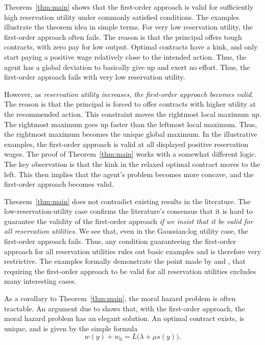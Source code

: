 Theorem~\ref{thm:main} shows that the first-order approach is valid for sufficiently high reservation utility under commonly satisfied conditions. The examples illustrate the theorem idea in simple terms. For very low reservation utility, the first-order approach often fails. The reason is that the principal offers tough contracts, with zero pay for low output. Optimal contracts have a kink, and only start paying a positive wage relatively close to the intended action. Thus, the agent has a global deviation to basically give up and exert no effort. Thus, the first-order approach fails with very low reservation utility.

However, as \emph{reservation utility increases, the first-order approach becomes valid}. The reason is that the principal is forced to offer contracts with higher utility at the recommended action. This constraint moves the rightmost local maximum up. The rightmost maximum goes up faster than the leftmost local maximum. Thus, the rightmost maximum becomes the unique global maximum. In the illustrative examples, the first-order approach is valid at all displayed positive reservation wages. The proof of Theorem~\ref{thm:main} works with a somewhat different logic. The key observation is that the kink in the relaxed optimal contract moves to the left. This then implies that the agent's problem becomes more concave, and the first-order approach becomes valid.

Theorem~\ref{thm:main} does not contradict existing results in the literature. The low-reservation-utility case confirms the literature's consensus that it is hard to guarantee the validity of the first-order approach \emph{if we insist that it be valid for all reservation utilities}. We see that, even in the Gaussian-log utility case, the first-order approach fails. Thus, any condition guaranteeing the first-order approach for all reservation utilities rules out basic examples and is therefore very restrictive. The examples formally demonstrate the point made by \textcite{chaigneau2022should} and \textcite{conlon2009two}, that requiring the first-order approach to be valid for all reservation utilities excludes many interesting cases.

As a corollary to Theorem~\ref{thm:main}, the moral hazard problem is often tractable. An argument due to \textcite{holmstrom1978incentives} shows that, with the first-order approach, the moral hazard problem has an elegant solution. An optimal contract exists, is unique, and is given by the simple formula
\begin{equation}
    \label{eq:optimal-wage}
    w(y) + w_0=L\bigl(\lambda+\mu s(y)\bigr).
\end{equation}

